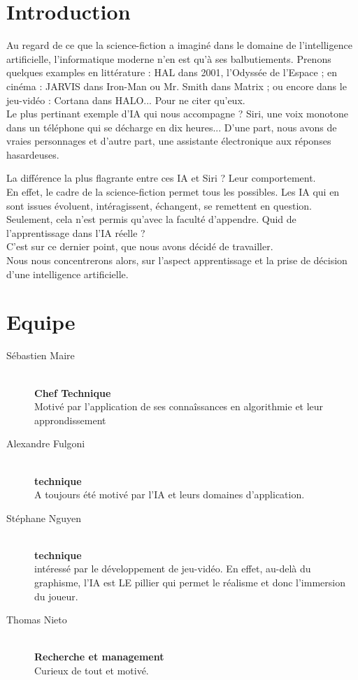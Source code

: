 \documentclass[a4paper]{report}
\begin{document}
  

  \section*{Introduction}
  Au regard de ce que la science-fiction a imaginé dans le domaine de l'intelligence artificielle, l'informatique moderne n'en est qu'à ses balbutiements.
  Prenons quelques examples en littérature : HAL dans 2001, l'Odyssée de l'Espace ;
  en cinéma : JARVIS dans Iron-Man ou Mr. Smith dans Matrix ; ou encore dans le jeu-vidéo : Cortana dans HALO... Pour ne citer qu'eux. \\
  Le plus pertinant exemple d'IA qui nous accompagne ? Siri, une voix monotone dans un téléphone qui se décharge en dix heures...
  D'une part, nous avons de vraies personnages et d'autre part, une assistante électronique aux réponses hasardeuses.

  \noindent
  La différence la plus flagrante entre ces IA et Siri ? Leur comportement. \\
  En effet, le cadre de la science-fiction permet tous les possibles. Les IA qui en sont issues évoluent, intéragissent, échangent, se remettent en question.
  Seulement, cela n'est permis qu'avec la faculté d'appendre. Quid de l'apprentissage dans l'IA réelle ? \\

  \noindent
  C'est sur ce dernier point, que nous avons décidé de travailler. \\
  Nous nous concentrerons alors, sur l'aspect apprentissage et la prise de décision d'une intelligence artificielle.

  \section*{Equipe}
    \begin{description}
      \item[Sébastien Maire] \hfill \\
        \textbf{Chef Technique} \\
        Motivé par l'application de ses connaîssances en algorithmie et leur approndissement
      \item[Alexandre Fulgoni] \hfill \\
        \textbf{technique} \\
        A toujours été motivé par l'IA et leurs domaines d'application.
      \item[Stéphane Nguyen] \hfill \\
        \textbf{technique} \\
        intéressé par le développement de jeu-vidéo. En effet,
        au-delà du graphisme, l’IA est LE pillier qui permet le réalisme
        et donc l’immersion du joueur.
      \item[Thomas Nieto] \hfill \\
        \textbf{Recherche et management} \\
        Curieux de tout et motivé.
    \end{description}
\end{document}
